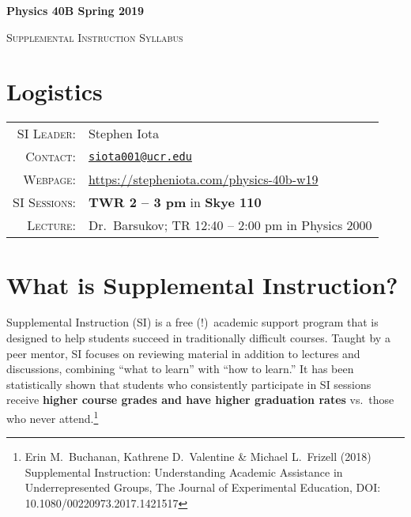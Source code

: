 \documentclass[11pt]{article}
\begin{document}
\begin{center}
\Large\textbf{{Physics 40B Spring 2019}}

\large{\textsc{Supplemental Instruction Syllabus}} 


\end{center}





\section*{Logistics}

\begin{tabular}{rl}

\textsc{SI Leader}:
&
Stephen Iota
\\
\textsc{Contact}:
&
\href{mailto:siota001@ucr.edu}{\texttt{siota001@ucr.edu}}
\\
\textsc{Webpage}:
&
\url{https://stepheniota.com/physics-40b-w19}
\\
\textsc{SI Sessions}:
&
\textbf{TWR 2 -- 3 pm} in \textbf{Skye 110}
\\
\textsc{Lecture:}
&
Dr.~Barsukov; TR 12:40 -- 2:00 pm  in Physics 2000
\\
\end{tabular}







\section*{What is Supplemental Instruction?}

Supplemental Instruction \textsc{(SI)} is a free (!)\ academic support program that is designed to help students succeed in traditionally difficult courses. 
Taught by a peer mentor, SI focuses on reviewing material in addition to lectures and discussions, combining ``what to learn'' with ``how to learn.''
It has been statistically shown that students who consistently participate in SI sessions receive \textbf{higher course grades and have higher graduation rates} vs.~those who never attend.\footnote{Erin M.~Buchanan, Kathrene D.~Valentine \& Michael L.~Frizell (2018) Supplemental Instruction: Understanding Academic Assistance in Underrepresented Groups, The Journal of Experimental Education, DOI: 10.1080/00220973.2017.1421517}
\end{document}
